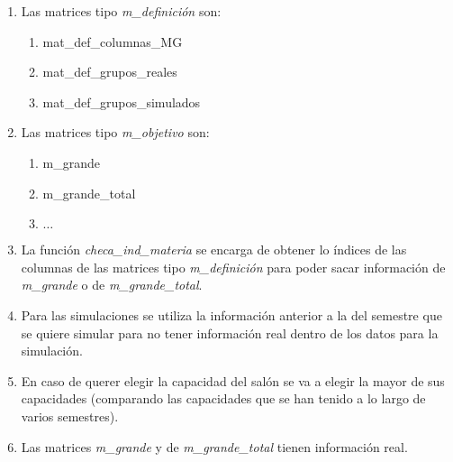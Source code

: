 \begin{appendices}
\begin{enumerate}
  \item Las matrices tipo \textit{m\_definición} son:
  
  	\begin{enumerate}
  		\item mat\_def\_columnas\_MG
		
		\item mat\_def\_grupos\_reales
		
		\item mat\_def\_grupos\_simulados
	\end{enumerate}
  
  \item Las matrices tipo \textit{m\_objetivo} son:
  
  	\begin{enumerate}
  		\item m\_grande
		
		\item m\_grande\_total
		
		\item $\ldots$
	\end{enumerate}  
  
  
  \item La función \textit{checa\_ind\_materia} se encarga de obtener lo índices de las columnas de las matrices tipo \textit{m\_definición} para poder sacar información de \textit{m\_grande} o de \textit{m\_grande\_total}.
  
  \item Para las simulaciones se utiliza la información anterior a la del semestre que se quiere simular para no tener información real dentro  de los datos para la simulación.
  
  \item En caso de querer elegir la capacidad del salón se va a elegir la mayor de sus capacidades (comparando las capacidades que se han tenido a lo largo de varios semestres).
  
  \item Las matrices \textit{m\_grande} y de \textit{m\_grande\_total} tienen información real.
  
%  
%  
%  
%  


\end{enumerate}
\end{appendices}
